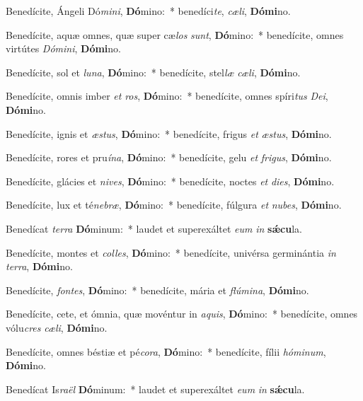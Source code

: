 \item Benedícite, Ángeli Dó\textit{mi}\textit{ni}, \textbf{Dó}mino:~* benedíci\textit{te}, \textit{cæ}\textit{li}, \textbf{Dó}\textbf{mi}no.
\item Benedícite, aquæ omnes, quæ super cæ\textit{los} \textit{sunt}, \textbf{Dó}mino:~* benedícite, omnes virtútes \textit{Dó}\textit{mi}\textit{ni}, \textbf{Dó}\textbf{mi}no.
\item Benedícite, sol et \textit{lu}\textit{na}, \textbf{Dó}mino:~* benedícite, stel\textit{læ} \textit{cæ}\textit{li}, \textbf{Dó}\textbf{mi}no.
\item Benedícite, omnis imber \textit{et} \textit{ros}, \textbf{Dó}mino:~* benedícite, omnes spíri\textit{tus} \textit{De}\textit{i}, \textbf{Dó}\textbf{mi}no.
\item Benedícite, ignis et \textit{æs}\textit{tus}, \textbf{Dó}mino:~* benedícite, frigus \textit{et} \textit{æs}\textit{tus}, \textbf{Dó}\textbf{mi}no.
\item Benedícite, rores et pru\textit{í}\textit{na}, \textbf{Dó}mino:~* benedícite, gelu \textit{et} \textit{fri}\textit{gus}, \textbf{Dó}\textbf{mi}no.
\item Benedícite, glácies et \textit{ni}\textit{ves}, \textbf{Dó}mino:~* benedícite, noctes \textit{et} \textit{di}\textit{es}, \textbf{Dó}\textbf{mi}no.
\item Benedícite, lux et té\textit{ne}\textit{bræ}, \textbf{Dó}mino:~* benedícite, fúlgura \textit{et} \textit{nu}\textit{bes}, \textbf{Dó}\textbf{mi}no.
\item Benedícat \textit{ter}\textit{ra} \textbf{Dó}minum:~* laudet et superexáltet \textit{e}\textit{um} \textit{in} \textbf{sǽ}\textbf{cu}la.
\item Benedícite, montes et \textit{col}\textit{les}, \textbf{Dó}mino:~* benedícite, univérsa germinántia \textit{in} \textit{ter}\textit{ra}, \textbf{Dó}\textbf{mi}no.
\item Benedícite, \textit{fon}\textit{tes}, \textbf{Dó}mino:~* benedícite, mária et \textit{flú}\textit{mi}\textit{na}, \textbf{Dó}\textbf{mi}no.
\item Benedícite, cete, et ómnia, quæ movéntur in \textit{a}\textit{quis}, \textbf{Dó}mino:~* benedícite, omnes vólu\textit{cres} \textit{cæ}\textit{li}, \textbf{Dó}\textbf{mi}no.
\item Benedícite, omnes béstiæ et pé\textit{co}\textit{ra}, \textbf{Dó}mino:~* benedícite, fílii \textit{hó}\textit{mi}\textit{num}, \textbf{Dó}\textbf{mi}no.
\item Benedícat Is\textit{ra}\textit{ël} \textbf{Dó}minum:~* laudet et superexáltet \textit{e}\textit{um} \textit{in} \textbf{sǽ}\textbf{cu}la.
